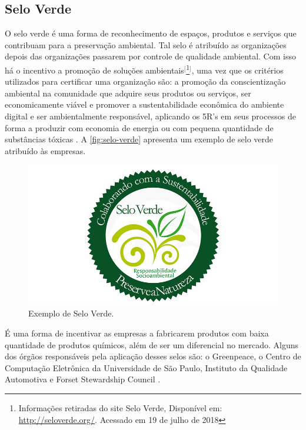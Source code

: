 \subsection{Selo Verde}

O selo verde é uma forma de reconhecimento de espaços, produtos e serviços que contribuam para a preservação ambiental. Tal selo é atribuído as organizações depois das organizações passarem por controle de qualidade ambiental. Com isso há o incentivo a promoção de soluções ambientais$^{[}$\footnote{Informações retiradas do site Selo Verde, Disponível em: \url{http://seloverde.org/}.  Acessado em 19 de julho de 2018}$^{]}$, uma vez que os critérios utilizados para certificar uma organização são:  a promoção da conscientização ambiental na comunidade que adquire seus produtos ou serviços, ser economicamente viável e promover a sustentabilidade econômica do ambiente digital e ser ambientalmente responsável, aplicando os 5R’s em seus processos de forma a produzir com economia de energia ou com pequena quantidade de substâncias tóxicas \cite{abreu2012ti}. A \autoref{fig:selo-verde} apresenta um exemplo de selo verde atribuído às empresas.

\begin{figure}[htb]
	\caption{\label{fig:selo-verde}Exemplo de Selo Verde.}
	\begin{center}
	    \includegraphics[scale=0.3]{imagens/selo-verde.jpg}
	\end{center}
\end{figure}

É uma forma de incentivar as empresas a fabricarem produtos com baixa quantidade de produtos químicos, além de ser um diferencial no mercado. Alguns dos órgãos responsáveis pela aplicação desses selos são: o Greenpeace, o Centro de Computação Eletrônica da Universidade de São Paulo, Instituto da Qualidade Automotiva e Forset Stewardship Council \cite{pinto2011estudo}.


